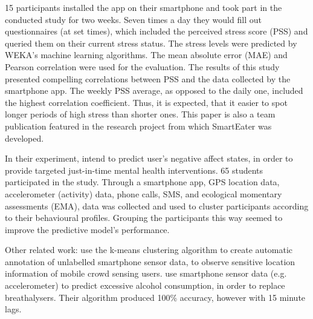 15 participants installed the app on their smartphone and took part in the conducted study for two weeks. Seven times a day they would fill out questionnaires (at set times), which included the perceived stress score (PSS) and queried them on their current stress status. The stress levels were predicted by WEKA's machine learning algorithms. The mean absolute error (MAE) and Pearson correlation were used for the evaluation. The results of this study presented compelling correlations between PSS and the data collected by the smartphone app. The weekly PSS average, as opposed to the daily one, included the highest correlation coefficient. Thus, it is expected, that it easier to spot longer periods of high stress than shorter ones. This paper is also a team publication featured in the research project from which SmartEater was developed.

In their experiment, \textcite{ClusterPassivelySensedData2018} intend to predict user's negative affect states, in order to provide targeted just-in-time mental health interventions. 65 students participated in the study. Through a smartphone app, GPS location data, accelerometer (activity) data, phone calls, SMS, and ecological momentary assessments (EMA), data was collected and used to cluster participants according to their behavioural profiles. Grouping the participants this way seemed to improve the predictive model's performance.


Other related work: 
\textcite{pius2018automatic} use the k-means clustering algorithm to create automatic annotation of unlabelled smartphone sensor data, to observe sensitive location information of mobile crowd sensing users. \textcite{alcoholCravingPrediction} use smartphone sensor data (e.g. accelerometer) to predict excessive alcohol consumption, in order to replace breathalysers. Their algorithm produced 100\% accuracy, however with 15 minute lags.










